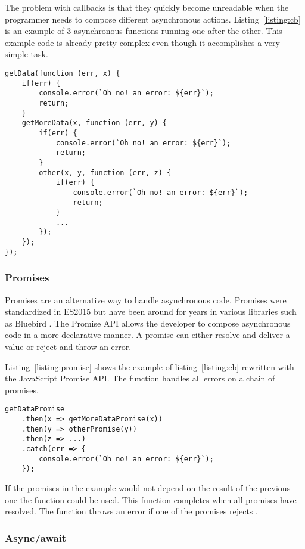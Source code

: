 The problem with callbacks is that they quickly become unreadable when the programmer needs to compose different asynchronous actions. Listing~\ref{listing:cb} is an example of 3 asynchronous functions running one after the other. This example code is already pretty complex even though it accomplishes a very simple task.

\begin{lstlisting}[caption=Fetching data  with nested callbacks,label=listing:cb,float]
getData(function (err, x) {
	if(err) {
		console.error(`Oh no! an error: ${err}`);
		return;
	}
	getMoreData(x, function (err, y) {
		if(err) {
			console.error(`Oh no! an error: ${err}`);
			return;
		}
		other(x, y, function (err, z) {
			if(err) {
				console.error(`Oh no! an error: ${err}`);
				return;
			}
			...
		});
	});
});
\end{lstlisting}

\subsubsection{Promises}

Promises are an alternative way to handle asynchronous code. Promises were standardized in ES2015 but have been around for years in various libraries such as Bluebird \cite{promise}. The Promise API allows the developer to compose asynchronous code in a more declarative manner. A promise can either resolve and deliver a value or reject and throw an error.

Listing~\ref{listing:promise} shows the example of listing~\ref{listing:cb} rewritten with the JavaScript Promise API. The  function handles all errors on a chain of promises.

\begin{lstlisting}[caption=Fetching data with the Promise API,label=listing:promise]
getDataPromise
	.then(x => getMoreDataPromise(x))
	.then(y => otherPromise(y))
	.then(z => ...)
	.catch(err => {
		console.error(`Oh no! an error: ${err}`);
	});
\end{lstlisting}

If the promises in the example would not depend on the result of the previous one the  function could be used. This function completes when all promises have resolved. The  function throws an error if one of the promises rejects \cite{prom-all}.

\subsubsection{Async/await}

